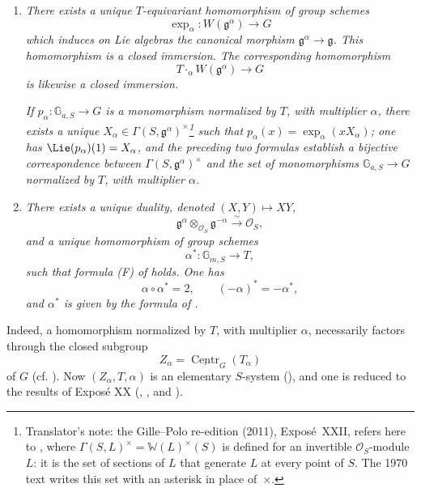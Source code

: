 \begin{enumerate}
\item[\SGAInlineRefTarget{sga3:xxii:thm:1.1:item:i}(i)] \textit{There exists a unique \(T\)-equivariant
homomorphism of group schemes}
\[
  \exp_{\alpha}:W(\mathfrak g^{\alpha})\longrightarrow G
\]
\textit{which induces on Lie algebras the canonical morphism
\(\mathfrak g^{\alpha}\to\mathfrak g\). This homomorphism is a closed
immersion. The corresponding homomorphism}
\[
  T\mathbin{\cdot_{\alpha}}W(\mathfrak g^{\alpha})
  \longrightarrow G
\]
\textit{is likewise a closed immersion.}

\textit{If
\(p_{\alpha}:\mathbb G_{a,S}\to G\) is a monomorphism normalized by
\(T\), with multiplier \(\alpha\), there exists a unique
\(X_{\alpha}\in\Gamma(S,\mathfrak g^{\alpha})^{\times}\)\footnote{Translator's note: the Gille--Polo re-edition (2011), Exposé~XXII, refers here
to , where
\(\Gamma(S,L)^\times=\mathbb W(L)^\times(S)\) is defined for an invertible
\(\mathcal O_S\)-module \(L\): it is the set of sections of \(L\) that
generate \(L\) at every point of \(S\). The 1970 text writes this set with an
asterisk in place of~\(\times\).} such that
\(p_{\alpha}(x)=\exp_{\alpha}(xX_{\alpha})\); one has
\(\Lie(p_{\alpha})(1)=X_{\alpha}\), and the preceding two formulas
establish a bijective correspondence between
\(\Gamma(S,\mathfrak g^{\alpha})^{\times}\) and the set of
monomorphisms \(\mathbb G_{a,S}\to G\) normalized by \(T\), with
multiplier \(\alpha\).}

\item[(ii)] \textit{There exists a unique duality, denoted
\((X,Y)\longmapsto XY\),}
\[
  \mathfrak g^{\alpha}\otimes_{\mathcal O_S}\mathfrak g^{-\alpha}
  \xrightarrow{\;\sim\;}\mathcal O_S,
\]
\textit{and a unique homomorphism of group schemes}
\[
  \alpha^*:\mathbb G_{m,S}\longrightarrow T,
\]
\textit{such that formula \textup{(F)} of  holds. One
has}
\[
  \alpha\circ\alpha^*=2,
  \qquad
  (-\alpha)^*=-\alpha^*,
\]
\textit{and \(\alpha^*\) is given by the formula of .}
\end{enumerate}

Indeed, a homomorphism normalized by \(T\), with multiplier \(\alpha\),
necessarily factors through the closed subgroup
\[
  Z_\alpha=\underline{\operatorname{Centr}}_G(T_\alpha)
\]
of \(G\) (cf. ). Now \((Z_\alpha,T,\alpha)\) is an
elementary \(S\)-system (), and one is reduced to the
results of Exposé XX (, , and ).

